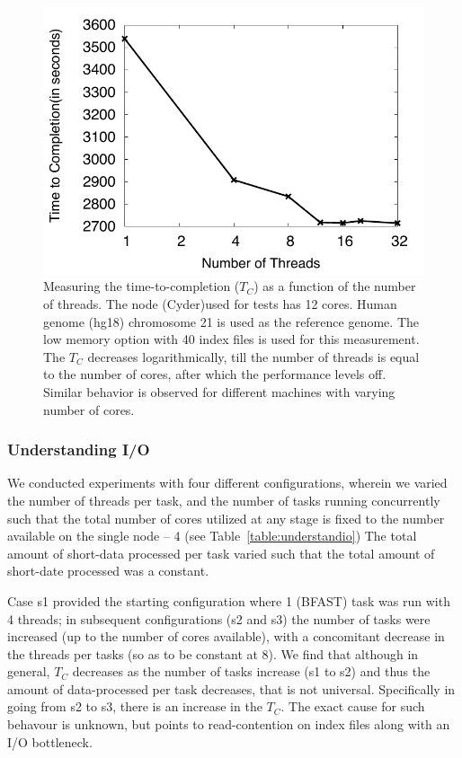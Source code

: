 \documentclass{cpeauth}
\begin{document}
 \begin{figure}
 \centering
\includegraphics[bb=0 0 340 300, scale=0.39]{figures/threadsvstime.pdf} 

\caption{\small Measuring the time-to-completion ($T_C$) as a function of the
  number of threads.  The node (Cyder)used for tests has 12 cores.  Human
  genome (hg18) chromosome 21 is used as the reference genome. The low
  memory option with 40 index files is used for this measurement. The
  $T_C$ decreases logarithmically, till the number of
  threads is equal to the number of cores, after which the performance
  levels off. Similar behavior is observed for different machines
  with varying number of cores.}
  \label{fig:threading-benchmark} 
 \end{figure}

\subsubsection{Understanding I/O}

We conducted experiments with four different configurations, wherein
we varied the number of threads per task, and the number of tasks
running concurrently such that the total number of cores utilized at
any stage is fixed to the number available on the single node -- 4
(see Table~\ref{table:understandio}) The total amount of short-data
processed per task varied such that the total amount of short-date
processed was a constant.

Case s1 provided the starting configuration where 1 (BFAST) task was
run with 4 threads; in subsequent configurations (s2 and s3) the
number of tasks were increased (up to the number of cores available),
with a concomitant decrease in the threads per tasks (so as to be
constant at 8). We find that although in general, $T_C$ decreases as
the number of tasks increase (s1 to s2) and thus the amount of
data-processed per task decreases, that is not universal. Specifically
in going from s2 to s3, there is an increase in the $T_C$.  The exact
cause for such behavour is unknown, but points to read-contention on
index files along with an I/O bottleneck.
\end{document}
